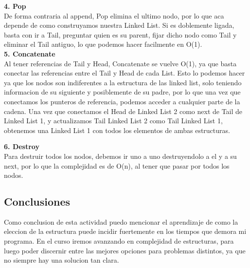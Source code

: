 \documentclass[12pt]{article}
\begin{document}
\textbf{4. Pop \\} 
De forma contraria al append, Pop elimina el ultimo nodo, por lo que aca depende de como construyamos nuestra Linked List. Si es doblemente ligada, basta con ir a Tail, preguntar quien es su parent, fijar dicho nodo como Tail y eliminar el Tail antiguo, lo que podemos hacer facilmente en O(1).\\

\textbf{5. Concatenate \\} 
Al tener referencias de Tail y Head, Concatenate se vuelve O(1), ya que basta conectar las referencias entre el Tail y Head de cada List. Esto lo podemos hacer ya que los nodos son indiferentes a la estructura de las linked list, solo teniendo informacion de su siguiente y posiblemente de su padre, por lo que una vez que conectamos los punteros de referencia, podemos acceder a cualquier parte de la cadena. Una vez que conectamos el Head de Linked List 2 como next de Tail de Linked List 1, y actualizamos Tail Linked List 2 como Tail Linked List 1, obtenemos una Linked List 1 con todos los elementos de ambas estructuras.

\newpage

\textbf{6. Destroy \\} 
Para destruir todos los nodos, debemos ir uno a uno destruyendolo a el y a su next, por lo que la complejidad es de O(n), al tener que pasar por todos los nodos.

\vspace{0.2cm}


\subsection*{Conclusiones}

Como conclusion de esta actividad puedo mencionar el aprendizaje de como la eleccion de la estructura puede incidir fuertemente en los tiempos que demora mi programa. En el curso iremos avanzando en complejidad de estructuras, para luego poder discernir entre las mejores opciones para problemas distintos, ya que no siempre hay una solucion tan clara.

\end{document}
